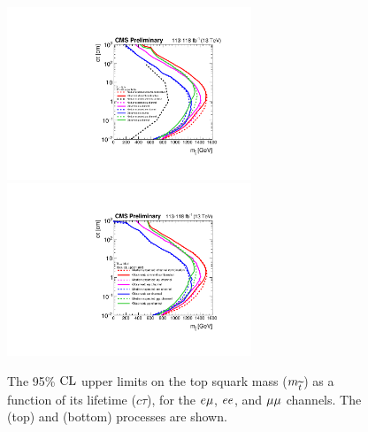 \begin{figure}
\centering
\includegraphics[width=0.65\textwidth]{figures/results/2DlimitsStopToLB.pdf}
\includegraphics[width=0.65\textwidth]{figures/results/2DlimitsStopToLD.pdf}
\caption{The 95\% $\text{CL}$ upper limits on the top squark mass ($m_{\widetilde{t}}$) as a function of its lifetime ($c\tau$), for the $e{\mu}$, $ee$, and ${\mu}{\mu}$ channels. The \stoptolb (top) and \stoptold (bottom) processes are shown.} 
\label{limits_individual}
\end{figure}

